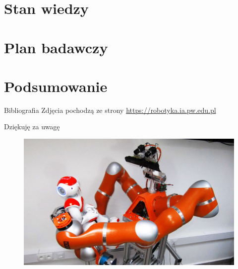 \documentclass{beamer}
\begin{document}
\section{Stan wiedzy}
\section{Plan badawczy}

%
%
\section{Podsumowanie}
\begin{frame}{Bibliografia}
Zdjęcia pochodzą ze strony \url{https://robotyka.ia.pw.edu.pl}
\end{frame}
\begin{frame}{Dziękuję za uwagę}
\begin{figure}[h]
	\centering
	\includegraphics[scale=1.4]{velma3}
\end{figure}
\end{frame}
\end{document}
